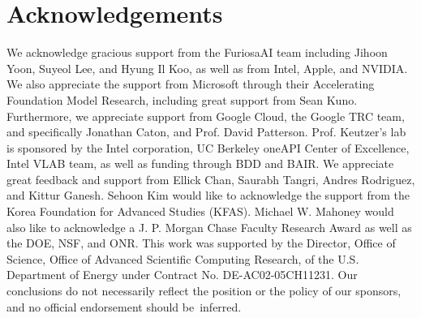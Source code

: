 \section{Acknowledgements}
We acknowledge gracious support from the FuriosaAI team including Jihoon Yoon, Suyeol Lee, and Hyung Il Koo, as well as from Intel, Apple, and NVIDIA.
We also appreciate the support from Microsoft through their Accelerating Foundation Model Research, including great support from Sean Kuno.
Furthermore, we appreciate support from
Google Cloud, the Google TRC team, and specifically Jonathan Caton, and Prof. David Patterson.
Prof. Keutzer's lab is sponsored by the Intel corporation, UC Berkeley oneAPI Center of Excellence, Intel VLAB team, as well as funding through BDD and BAIR.
We appreciate great feedback and support from Ellick Chan, Saurabh Tangri, Andres Rodriguez, and Kittur Ganesh.
Sehoon Kim would like to acknowledge the support from the Korea Foundation for Advanced Studies (KFAS).
Michael W. Mahoney would also like to acknowledge
a J. P. Morgan Chase Faculty Research Award as well as the DOE, NSF, and ONR.
This work was supported by the Director, Office of Science, Office of Advanced Scientific Computing Research, of the U.S. Department of Energy under Contract No. DE-AC02-05CH11231.
Our conclusions do not necessarily reflect the position or the policy of our sponsors, and no official endorsement should be~inferred.